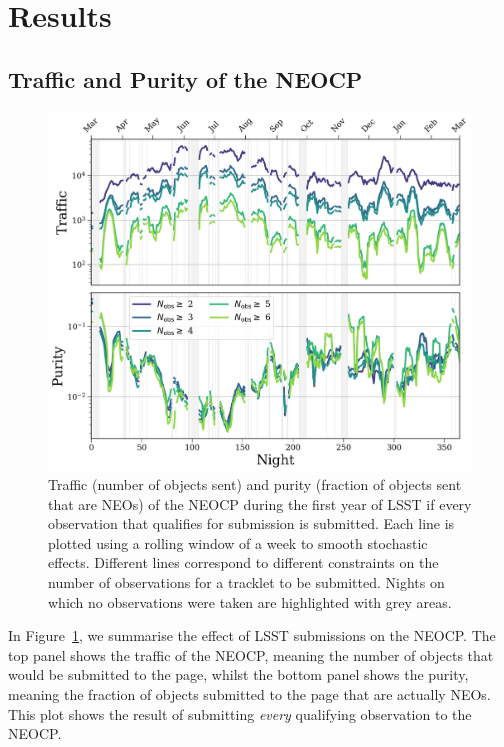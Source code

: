 \documentclass[twocolumn]{aastex631}
\begin{document}
\section{Results} \label{sec:results}
\subsection{Traffic and Purity of the NEOCP}\label{sec:traffic_basic}
\begin{figure}
    \centering
    \includegraphics[width=\textwidth]{traffic_purity.png}
    \caption{Traffic (number of objects sent) and purity (fraction of objects sent that are NEOs) of the NEOCP during the first year of LSST if every observation that qualifies for submission is submitted. Each line is plotted using a rolling window of a week to smooth stochastic effects. Different lines correspond to different constraints on the number of observations for a tracklet to be submitted. Nights on which no observations were taken are highlighted with grey areas.}
    \label{fig:neocp_traffic}
\end{figure}

In Figure~\ref{fig:neocp_traffic}, we summarise the effect of LSST submissions on the NEOCP. The top panel shows the traffic of the NEOCP, meaning the number of objects that would be submitted to the page, whilst the bottom panel shows the purity, meaning the fraction of objects submitted to the page that are actually NEOs. This plot shows the result of submitting \textit{every} qualifying observation to the NEOCP.
\end{document}
